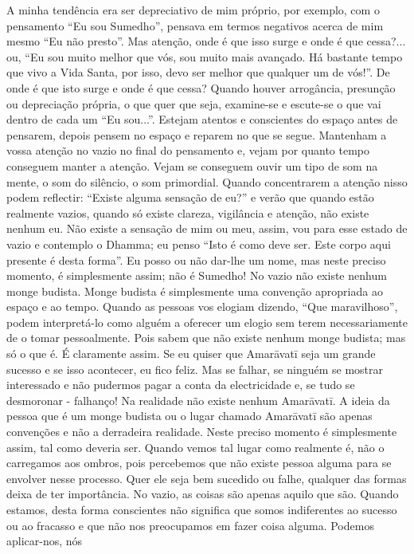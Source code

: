 A minha tendência era ser depreciativo de mim próprio,
por exemplo, com o pensamento “Eu sou Sumedho”, pensava
em termos negativos acerca de mim mesmo “Eu não presto”.
Mas atenção, onde é que isso surge e onde é que cessa?... ou,
“Eu sou muito melhor que vós, sou muito mais avançado. Há
bastante tempo que vivo a Vida Santa, por isso, devo ser melhor
que qualquer um de vós!”. De onde é que isto surge e onde é
que cessa?
Quando houver arrogância, presunção ou depreciação
própria, o que quer que seja, examine-se e escute-se o que vai
dentro de cada um “Eu sou...”. Estejam atentos e conscientes
do espaço antes de pensarem, depois pensem no espaço e
reparem no que se segue. Mantenham a vossa atenção no
vazio no final do pensamento e, vejam por quanto tempo
conseguem manter a atenção. Vejam se conseguem ouvir um
tipo de som na mente, o som do silêncio, o som primordial.
Quando concentrarem a atenção nisso podem reflectir:
“Existe alguma sensação de eu?” e verão que quando estão
realmente vazios, quando só existe clareza, vigilância e
atenção, não existe nenhum eu. Não existe a sensação de mim
ou meu, assim, vou para esse estado de vazio e contemplo o
Dhamma; eu penso “Isto é como deve ser. Este corpo aqui
presente é desta forma”. Eu posso ou não dar-lhe um nome,
mas neste preciso momento, é simplesmente assim; não é
Sumedho!
No vazio não existe nenhum monge budista. Monge
budista é simplesmente uma convenção apropriada ao espaço
e ao tempo. Quando as pessoas vos elogiam dizendo, “Que
maravilhoso”, podem interpretá-lo como alguém a oferecer
um elogio sem terem necessariamente de o tomar pessoalmente. Pois sabem que não existe nenhum monge budista;
mas só o que é. É claramente assim. Se eu quiser que
Amarāvatī seja um grande sucesso e se isso acontecer, eu
fico feliz. Mas se falhar, se ninguém se mostrar interessado e
não pudermos pagar a conta da electricidade e, se tudo se
desmoronar - falhanço! Na realidade não existe nenhum
Amarāvatī. A ideia da pessoa que é um monge budista ou o
lugar chamado Amarāvatī são apenas convenções e não a
derradeira realidade. Neste preciso momento é simplesmente
assim, tal como deveria ser. Quando vemos tal lugar como
realmente é, não o carregamos aos ombros, pois percebemos
que não existe pessoa alguma para se envolver nesse processo.
Quer ele seja bem sucedido ou falhe, qualquer das formas
deixa de ter importância.
No vazio, as coisas são apenas aquilo que são. Quando
estamos, desta forma conscientes não significa que somos
indiferentes ao sucesso ou ao fracasso e que não nos
preocupamos em fazer coisa alguma. Podemos aplicar-nos, nós
